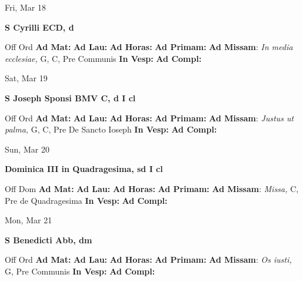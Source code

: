 \documentclass[10pt]{article}
\begin{document}
\begin{minipage}{3.5in}
\vspace{2em}\begin{center}
Fri, Mar 18
\end{center}\textbf{ \large S Cyrilli ECD, \textnormal{\normalsize d}}
\begin{justify}
Off Ord
\textbf{Ad Mat: }
\textbf{Ad Lau: }
\textbf{Ad Horas: }
\textbf{Ad Primam: }
\textbf{Ad Missam}: \textit{In media ecclesiae,} G, C, Pre Communis
\textbf{In Vesp: }
\textbf{Ad Compl: }\end{justify}
\end{minipage}



\begin{minipage}{3.5in}
\vspace{2em}\begin{center}
Sat, Mar 19
\end{center}\textbf{ \large S Joseph Sponsi BMV C, \textnormal{\normalsize d I cl}}
\begin{justify}
Off Ord
\textbf{Ad Mat: }
\textbf{Ad Lau: }
\textbf{Ad Horas: }
\textbf{Ad Primam: }
\textbf{Ad Missam}: \textit{Justus ut palma,} G, C, Pre De Sancto Ioseph
\textbf{In Vesp: }
\textbf{Ad Compl: }\end{justify}
\end{minipage}



\begin{minipage}{3.5in}
\vspace{2em}\begin{center}
Sun, Mar 20
\end{center}\textbf{ \large Dominica III in Quadragesima, \textnormal{\normalsize sd I cl}}
\begin{justify}
Off Dom
\textbf{Ad Mat: }
\textbf{Ad Lau: }
\textbf{Ad Horas: }
\textbf{Ad Primam: }
\textbf{Ad Missam}: \textit{Missa,} C, Pre de Quadragesima
\textbf{In Vesp: }
\textbf{Ad Compl: }\end{justify}
\end{minipage}



\begin{minipage}{3.5in}
\vspace{2em}\begin{center}
Mon, Mar 21
\end{center}\textbf{ \large S Benedicti Abb, \textnormal{\normalsize dm}}
\begin{justify}
Off Ord
\textbf{Ad Mat: }
\textbf{Ad Lau: }
\textbf{Ad Horas: }
\textbf{Ad Primam: }
\textbf{Ad Missam}: \textit{Os iusti,} G, Pre Communis
\textbf{In Vesp: }
\textbf{Ad Compl: }\end{justify}
\end{minipage}
\end{document}
